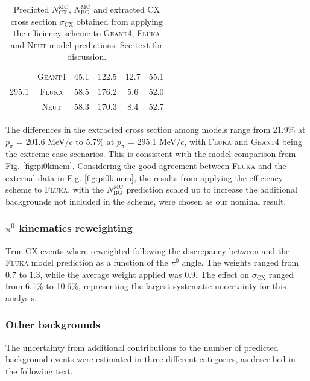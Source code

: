 \begin{table}[htbp]
\begin{center}
\begin{tabular}{c|c|c|c|c|c}
\multirow{4}{*}{295.1} %
& \textsc{Geant4} & 45.1 & 122.5 & 12.7 & 55.1 \\
& \textsc{Fluka} & 58.5 & 176.2 & 5.6 & 52.0 \\
& \textsc{Neut} & 58.3 & 170.3 & 8.4 & 52.7 \\ \hline
\end{tabular}
\caption{Predicted $N_{\mathrm{CX}}^{\mathrm{MC}}$, $N_{\mathrm{BG}}^{\mathrm{MC}}$ and extracted CX cross section $\sigma_{\mathrm{CX}}$ obtained from applying the efficiency scheme to \textsc{Geant4}, \textsc{Fluka} and \textsc{Neut} model predictions. See text for discussion.}
\label{tbl:eff_scheme_results}
\end{center}
\end{table}

The differences in the extracted cross section among models range from 21.9\% at $p_{\pi}$ = 201.6 MeV$/c$ to 5.7\% at $p_{\pi}$ = 295.1 MeV$/c$, with \textsc{Fluka} and \textsc{Geant4} being the extreme case scenarios. This is consistent with the model comparison from Fig. \ref{fig:pi0kinem}. Considering the good agreement between \textsc{Fluka} and the external data in Fig. \ref{fig:pi0kinem}, the results from applying the efficiency scheme to \textsc{Fluka}, with the $N_{\mathrm{BG}}^{\mathrm{MC}}$ prediction scaled up to increase the additional backgrounds not included in the scheme, were chosen as our nominal result.

\subsubsection{\bf{$\pi^{0}$ kinematics reweighting}}
True CX events where reweighted following the discrepancy between \cite{Ashery2} and the \textsc{Fluka} model prediction as a function of the $\pi^{0}$ angle. The weights ranged from 0.7 to 1.3, while the average weight applied was 0.9. The effect on $\sigma_{\mathrm{CX}}$ ranged  from 6.1\% to 10.6\%, representing the largest systematic uncertainty for this analysis.

\subsubsection{\bf Other backgrounds}\label{sec:background}
The uncertainty from additional contributions to the number of predicted background events were estimated in three different categories, as described in the following text.

